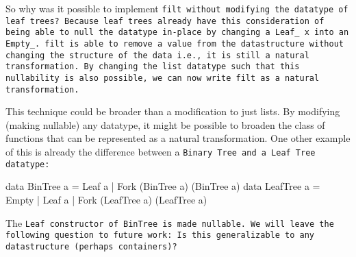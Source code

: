 So why was it possible to implement \tt{filt} without modifying the datatype of leaf trees?
Because leaf trees already have this consideration of being able to null the datatype in-place by changing a \tt{Leaf\_ x} into an \tt{Empty\_}.
\tt{filt} is able to remove a value from the datastructure without changing the structure of the data i.e., it is still a natural transformation.
By changing the list datatype such that this nullability is also possible, we can now write \tt{filt} as a natural transformation.

This technique could be broader than a modification to just lists.
By modifying (making nullable) any datatype, it might be possible to broaden the class of functions that can be represented as a natural transformation.
One other example of this is already the difference between a \tt{Binary Tree} and a \tt{Leaf Tree} datatype:
\begin{spec}
data BinTree a = Leaf a | Fork (BinTree a) (BinTree a)
data LeafTree a = Empty | Leaf a | Fork (LeafTree a) (LeafTree a)
\end{spec}
The \tt{Leaf} constructor of \tt{BinTree} is made nullable.
We will leave the following question to future work: Is this generalizable to any datastructure (perhaps containers)?






